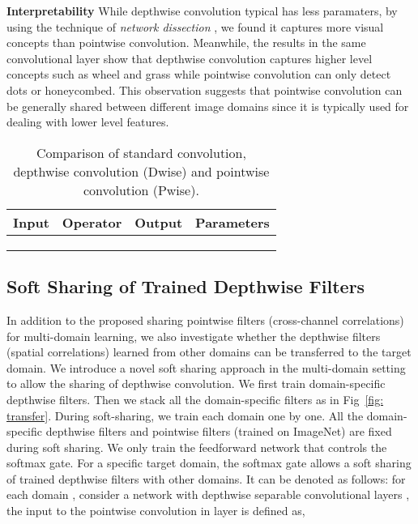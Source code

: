 \documentclass[letterpaper]{article} \usepackage{aaai19}  \usepackage{times}  \usepackage{helvet}  \usepackage{courier}  \usepackage{url}  \usepackage{graphicx}  \usepackage{amssymb}
\begin{document}
\noindent\textbf{Interpretability} While depthwise convolution typical has less paramaters, by using the technique of \textit{network dissection} \cite{bau2017network}, we found it captures more visual concepts than pointwise convolution. Meanwhile, the results in the same convolutional layer show that depthwise convolution captures higher level concepts such as wheel and grass while pointwise convolution can only detect dots or honeycombed. This observation suggests that pointwise convolution can be generally shared between different image domains since it is typically used for dealing with lower level features.  

\begin{center}
\begin{table}
\small
\begin{tabular}{ |c|c|c|c| } 
 \hline
Input & Operator & Output  & Parameters \\ 
\hline
  &  &   &   \\ 
  &  &   &  \\
   &  &  &  \\ 
 \hline
\end{tabular}
\caption{Comparison of standard  convolution,  depthwise convolution (Dwise) and  pointwise convolution (Pwise).}
\label{table: comparison}
\end{table}
\end{center}


\subsection{Soft Sharing of Trained Depthwise Filters}
In addition to the proposed sharing pointwise filters (cross-channel correlations) for multi-domain learning, we also investigate whether the depthwise filters (spatial correlations) learned from other domains can be transferred to the target domain. We introduce a novel soft sharing approach in the multi-domain setting to allow the sharing of depthwise convolution. We first train domain-specific depthwise filters. Then we stack all the domain-specific filters as in Fig~\ref{fig: transfer}. During soft-sharing, we train each domain one by one. All the domain-specific depthwise filters and pointwise filters (trained on ImageNet) are fixed during soft sharing. We only train the feedforward network that controls the softmax gate. For a specific target domain, the softmax gate allows a soft sharing of trained depthwise filters with other domains. It can be denoted as follows: for each domain , consider a network with  depthwise separable convolutional layers , the input to the pointwise convolution in layer   is defined as,
\end{document}
